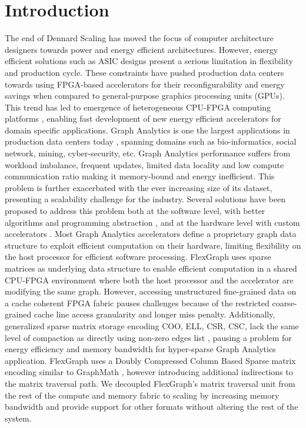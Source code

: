 \section{Introduction}

The end of Dennard Scaling \cite{Dark-Silicon} has moved the focus of computer architecture designers towards power and energy efficient architectures. However, energy efficient solutions such as ASIC designs present a serious limitation in flexibility and production cycle. These constraints have pushed production data centers towards using FPGA-based accelerators \cite{Catapult} for their reconfigurability and energy savings when compared to general-purpose graphics processing units (GPUs).
This trend has led to emergence of heterogeneous CPU-FPGA computing platforms \cite{Intel-FPGA} \cite{IBM-FPGA}, enabling fast development of new energy efficient accelerators \cite{CPU-FPGA} for domain specific applications. Graph Analytics is one the largest applications in production data centers today \cite{BigData}, 
spanning domains such as bio-informatics, social network, mining, cyber-security, etc. Graph Analytics performance suffers from workload imbalance, frequent updates, limited data locality and low compute communication ratio making it memory-bound and energy inefficient. This problem is further exacerbated with the ever increasing size of its dataset, presenting a scalability challenge for the industry. Several solutions have been proposed to address this problem both at the software level, with better algorithms and programming abstraction \cite{GraphX} \cite{Galois} \cite{GraphMat} \cite{Pregel} \cite{GraphLab}, and at the hardware level with custom accelerators \cite {Graphicionado} \cite{Tesseract} \cite{GraphOps}. Most Graph Analytics accelerators \cite {Graphicionado} \cite{Tesseract} \cite{GraphOps} define a proprietary graph data structure to exploit efficient computation on their hardware, limiting flexibility on the host processor for efficient software processing. FlexGraph uses sparse matrices as underlying data structure to enable efficient computation in a shared CPU-FPGA environment where both the host processor and the accelerator are modifying the same graph. However, accessing unstructured fine-grained data on a cache coherent FPGA fabric pauses challenges because of the restricted coarse-grained cache line access granularity and longer miss penalty. Additionally, generalized sparse matrix storage encoding COO, ELL, CSR, CSC, lack the same level of compaction as directly using non-zero edges list \cite {Graphicionado}, pausing a problem for energy efficiency and memory bandwidth for hyper-sparse Graph Analytics application. FlexGraph uses a Doubly Compressed Column Based Sparse matrix encoding similar to GraphMath \cite{GraphMat}, however introducing additional indirections to the matrix traversal path. We decoupled FlexGraph's matrix traversal unit from the rest of the compute and memory fabric to scaling by increasing memory bandwidth and provide support for other formats without altering the rest of the system.\\
